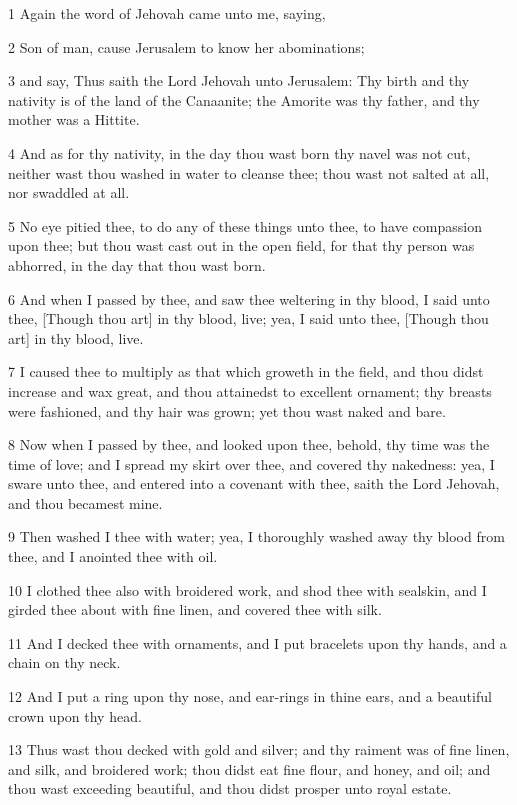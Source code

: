 \par 1 Again the word of Jehovah came unto me, saying,
\par 2 Son of man, cause Jerusalem to know her abominations;
\par 3 and say, Thus saith the Lord Jehovah unto Jerusalem: Thy birth and thy nativity is of the land of the Canaanite; the Amorite was thy father, and thy mother was a Hittite.
\par 4 And as for thy nativity, in the day thou wast born thy navel was not cut, neither wast thou washed in water to cleanse thee; thou wast not salted at all, nor swaddled at all.
\par 5 No eye pitied thee, to do any of these things unto thee, to have compassion upon thee; but thou wast cast out in the open field, for that thy person was abhorred, in the day that thou wast born.
\par 6 And when I passed by thee, and saw thee weltering in thy blood, I said unto thee, [Though thou art] in thy blood, live; yea, I said unto thee, [Though thou art] in thy blood, live.
\par 7 I caused thee to multiply as that which groweth in the field, and thou didst increase and wax great, and thou attainedst to excellent ornament; thy breasts were fashioned, and thy hair was grown; yet thou wast naked and bare.
\par 8 Now when I passed by thee, and looked upon thee, behold, thy time was the time of love; and I spread my skirt over thee, and covered thy nakedness: yea, I sware unto thee, and entered into a covenant with thee, saith the Lord Jehovah, and thou becamest mine.
\par 9 Then washed I thee with water; yea, I thoroughly washed away thy blood from thee, and I anointed thee with oil.
\par 10 I clothed thee also with broidered work, and shod thee with sealskin, and I girded thee about with fine linen, and covered thee with silk.
\par 11 And I decked thee with ornaments, and I put bracelets upon thy hands, and a chain on thy neck.
\par 12 And I put a ring upon thy nose, and ear-rings in thine ears, and a beautiful crown upon thy head.
\par 13 Thus wast thou decked with gold and silver; and thy raiment was of fine linen, and silk, and broidered work; thou didst eat fine flour, and honey, and oil; and thou wast exceeding beautiful, and thou didst prosper unto royal estate.
